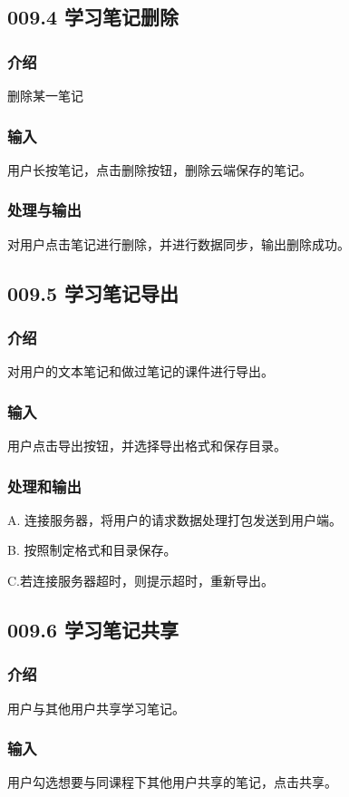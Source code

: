  \subsection{009.4 学习笔记删除}
    \subsubsection{介绍}
	删除某一笔记
    \subsubsection{输入}
	用户长按笔记，点击删除按钮，删除云端保存的笔记。
    \subsubsection{处理与输出}
	对用户点击笔记进行删除，并进行数据同步，输出删除成功。


 \subsection{009.5 学习笔记导出}
    \subsubsection{介绍}
	对用户的文本笔记和做过笔记的课件进行导出。
    \subsubsection{输入}
	用户点击导出按钮，并选择导出格式和保存目录。
    \subsubsection{处理和输出}
	A. 连接服务器，将用户的请求数据处理打包发送到用户端。

	B. 按照制定格式和目录保存。

	C.若连接服务器超时，则提示超时，重新导出。

 \subsection{009.6 学习笔记共享}
    \subsubsection{介绍}
	用户与其他用户共享学习笔记。
    \subsubsection{输入}
	用户勾选想要与同课程下其他用户共享的笔记，点击共享。
